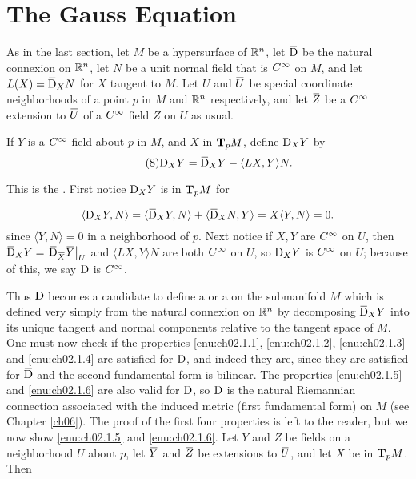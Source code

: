 \documentclass[../main]{subfiles}
\begin{document}
\section{The Gauss Equation}\label{ch02:s3}

As in the last section, let $M$ be a hypersurface of $\bR^{n}$, let $\covariant$ be the natural connexion on $\bR^{n}$, let $N$ be a unit normal field that is $\CInfty$ on $M$, and let $L(X)=\covariant_{X} N$ for $X$ tangent to $M$. Let $U$ and $\xoverline{U}$ be special coordinate neighborhoods of a point $p$ in $M$ and $\bR^{n}$ respectively, and let $\xoverline{Z}$ be a $\CInfty$ extension to $\xoverline{U}$ of a $\CInfty$ field $Z$ on $U$ as usual.

If $Y$ is a $\CInfty$ field about $p$ in $M$, and $X$ in $\tangentspace{M}{p}$, define $\connection_{X} Y$ by
\begin{equation}\tag{8}\label{eqn:ch02.3.8}
  \connection_{X} Y=\covariant_{X} Y-\langle L X, Y\rangle N.  
\end{equation}


This is the . First notice $\connection_{X} Y$ is in $\tangentspace{M}{p}$ for

\[
\langle \connection_{X} Y, N\rangle=\langle\covariant_{X} Y, N\rangle + \langle\covariant_{X} N, Y\rangle=X\langle Y, N\rangle=0.
\]
since $\langle Y, N\rangle=0$ in a neighborhood of $p$. Next notice if $X, Y$ are $\CInfty$ on $U$, then $\covariant_{X} Y=\left.\covariant_{\xoverline{X}} \xoverline{Y}\right|_{U}$ and $\langle L X, Y\rangle N$ are both $\CInfty$ on $U$, so $\connection_{X} Y$ is $\CInfty$ on $U$; because of this, we say $\connection$ is $\CInfty$.

Thus $\connection$ becomes a candidate to define a  or a  on the submanifold $M$ which is defined very simply from the natural connexion on $\bR^{n}$ by decomposing $\covariant_{X} Y$ into its unique tangent and normal components relative to the tangent space of $M$. One must now check if the properties \ref{enu:ch02.1.1}, \ref{enu:ch02.1.2}, \ref{enu:ch02.1.3} and \ref{enu:ch02.1.4} are satisfied for $\connection$, and indeed they are, since they are satisfied for $\covariant$ and the second fundamental form is bilinear. The properties \ref{enu:ch02.1.5} and \ref{enu:ch02.1.6} are also valid for $\connection$, so $\connection$ is the natural Riemannian connection associated with the induced metric (first fundamental form) on $M$ (see Chapter \ref{ch06}). The proof of the first four properties is left to the reader, but we now show \ref{enu:ch02.1.5} and \ref{enu:ch02.1.6}. Let $Y$ and $Z$ be fields on a neighborhood $U$ about $p$, let $\xoverline{Y}$ and $\xoverline{Z}$ be extensions to $\xoverline{U}$, and let $X$ be in $\tangentspace{M}{p}$. Then
\end{document}
